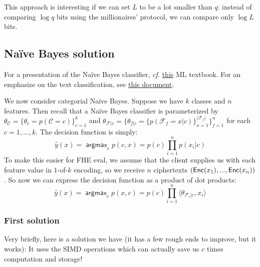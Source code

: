 \documentclass[11pt]{article}
\DeclareMathOperator*{\argmax}{\mathsf{argmax}}
\begin{document}
	This approach is interesting if we can set $L$ to be a lot smaller than $q$: instead of comparing $\log q$ bits using the millionaires' protocol, we can compare only $\log L$ bits.  
	

\subsection{Na\"ive Bayes solution}

%
\newcommand{\NB}{Na\"ive Bayes}
      
For a presentation of the \NB{} classifier, \emph{cf.} \href{http://www.cs.cmu.edu/~tom/mlbook/NBayesLogReg.pdf}{this} ML textbook. For an emphasize on the text classification, see \href{http://nlp.stanford.edu/IR-book/html/htmledition/naive-bayes-text-classification-1.html}{this document}.

We now consider categorial \NB{}. Suppose we have $k$ classes and $n$ features.
Then recall that a \NB{} classifier is parameterized by $\theta_{\mathcal{C}} =
\{\theta_{c}=p(\mathcal{C}=c)\}_{c=1}^{k}$ and $\theta_{\mathcal{F}|c} =
\{\theta_{f|c}= \{ p(\mathcal{F}_f=x|c) \}_{x=1}^{|\mathcal{F}_f|}
\}_{f=1}^{n}$ for each $c = 1,...,k$. The decision function is simply:
\begin{equation*}
  \hat{y}(x) = \argmax_{c} p(c, x) = p(c)\prod\limits_{i=1}^{n}p(x_i|c)
\end{equation*}
To make this easier for FHE eval, we assume that the client supplies us with each feature value
in $1$-of-$k$ encoding, so we receive $n$ ciphertexts $(\mathsf{Enc}(x_1), ..., \mathsf{Enc}(x_n))$. So now we
can express the decision function as a product of dot products:
\begin{equation*}
  \hat{y}(x) = \argmax_{c} p(x,c) = p(c)\prod\limits_{i=1}^{n} \langle \theta_{\mathcal{F}_i|c}, x_i \rangle
\end{equation*}

      
\subsubsection{First solution} %
\label{ssub:bayes_solution_1}

Very briefly, here is a solution we have (it has a few rough ends to improve, but it works): It uses the SIMD operations which can actually save us $c$ times computation and storage!
\end{document}
